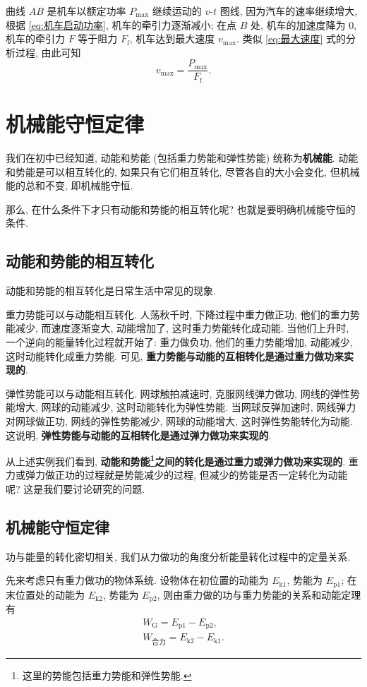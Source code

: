 \documentclass[UTF8,openany,fontset=fandol]{ctexbook}
\theoremstyle{chinesetextbook}
\begin{document}
曲线 $AB$ 是机车以额定功率 $P_\mathrm{max}$ 继续运动的 $v$-$t$ 图线, 因为汽车的速率继续增大, 根据 \eqref{eq:机车启动功率}, 机车的牵引力逐渐减小; 在点 $B$ 处, 机车的加速度降为 0, 机车的牵引力 $F$ 等于阻力 $F_\mathrm{f}$, 机车达到最大速度 $v_\mathrm{max}$. 类似 \eqref{eq:最大速度} 式的分析过程, 由此可知
\[
v_\mathrm{max}=\frac{P_\mathrm{max}}{F_\mathrm{f}}.
\]
\section{机械能守恒定律}
我们在初中已经知道, 动能和势能 (包括重力势能和弹性势能) 统称为\textbf{机械能}. 动能和势能是可以相互转化的, 如果只有它们相互转化, 尽管各自的大小会变化, 但机械能的总和不变, 即机械能守恒.

那么, 在什么条件下才只有动能和势能的相互转化呢? 也就是要明确机械能守恒的条件.
\subsection{动能和势能的相互转化}
动能和势能的相互转化是日常生活中常见的现象.

重力势能可以与动能相互转化. 人荡秋千时, 下降过程中重力做正功, 他们的重力势能减少, 而速度逐渐变大, 动能增加了, 这时重力势能转化成动能. 当他们上升时, 一个逆向的能量转化过程就开始了: 重力做负功, 他们的重力势能增加, 动能减少, 这时动能转化成重力势能. 可见, \textbf{重力势能与动能的互相转化是通过重力做功来实现的}.

弹性势能可以与动能相互转化. 网球触拍减速时, 克服网线弹力做功, 网线的弹性势能增大, 网球的动能减少, 这时动能转化为弹性势能. 当网球反弹加速时, 网线弹力对网球做正功, 网线的弹性势能减少, 网球的动能增大, 这时弹性势能转化为动能. 这说明, \textbf{弹性势能与动能的互相转化是通过弹力做功来实现的}.

从上述实例我们看到, \textbf{动能和势能\footnote{这里的势能包括重力势能和弹性势能.}之间的转化是通过重力或弹力做功来实现的}. 重力或弹力做正功的过程就是势能减少的过程, 但减少的势能是否一定转化为动能呢? 这是我们要讨论研究的问题.
\subsection{机械能守恒定律}
功与能量的转化密切相关, 我们从力做功的角度分析能量转化过程中的定量关系.

先来考虑只有重力做功的物体系统. 设物体在初位置的动能为 $E_\mathrm{k1}$, 势能为 $E_\mathrm{p1}$; 在末位置处的动能为 $E_\mathrm{k2}$, 势能为 $E_\mathrm{p2}$, 则由重力做的功与重力势能的关系和动能定理有
\[
\begin{gathered}
W_\text{G}=E_\mathrm{p1}-E_\mathrm{p2},\\
W_\text{合力}=E_\mathrm{k2}-E_\mathrm{k1}.
\end{gathered}
\]
\end{document}
